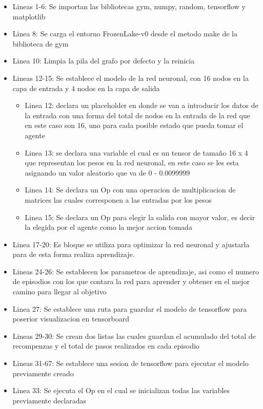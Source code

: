 \begin{itemize}
    \item Lineas 1-6: Se importan las bibliotecas gym, numpy, random, tensorflow y matplotlib
    \item Linea 8: Se carga el entorno FrozenLake-v0 desde el metodo make de la biblioteca de gym
    \item Linea 10: Limpia la pila del grafo por defecto y la reinicia
    \item Lineas 12-15: Se establece el modelo de la red neuronal, con 16 nodos en la capa de entrada y 4 nodos en la capa de salida
    	\begin{itemize}
    		\item Linea 12: declara un placeholder en donde se van a introducir los datos de la entrada con una forma del total de nodos en la entrada de la red que en este caso son 16, uno para cada posible estado que pueda tomar el agente
    		\item Linea 13: se declara una variable el cual es un tensor de tamaño 16 x 4 que representan los pesos en la red neuronal, en este caso se les esta asignando un valor aleatorio que va de 0 - 0.0099999
    		\item Linea 14: Se declara un Op con una operacion de multiplicacion de matrices las cuales corresponen a las entradas por los pesos
    		\item Linea 15: Se declara un Op para elegir la salida con mayor valor, es decir la elegida por el agente como la mejor accion tomada
    	\end{itemize}
    \item Linea 17-20: Es bloque se utiliza para optimizar la red neuronal y ajustarla para de esta forma realiza aprendizaje.
    \item Lineas 24-26: Se establecen los parametros de aprendizaje, asi como el numero de episodios con los que contara la red para aprender y obtener en el mejor camino para llegar al objetivo
    \item Linea 27: Se establece una ruta para guardar el modelo de tensorflow para poserior visualizacion en tensorboard
    \item Lineas 29-30: Se crean dos listas las cuales guardan el acumulado del total de recompenzas y el total de pasos realizados en cada episodio
    \item Lineas 31-67: Se establece una sesion de tensorflow para ejecutar el modelo previamente creado
    \item Linea 33: Se ejecuta el Op en el cual se inicializan todas las variables previamente declaradas

\end{itemize}
